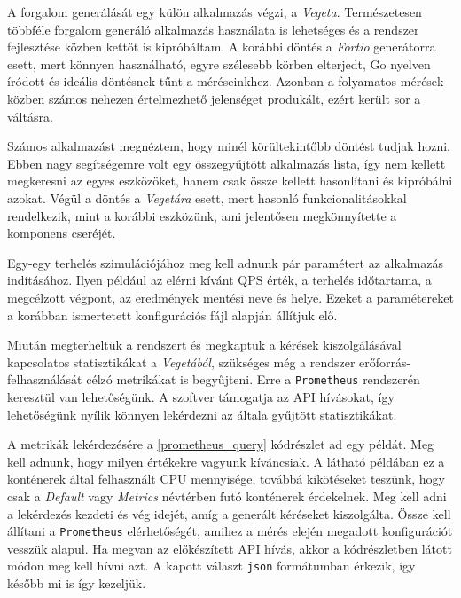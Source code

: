 \lstset{caption=Mérés konfigurációja, label=measurement_config}


A forgalom generálását egy külön alkalmazás végzi, a \textit{Vegeta}\citep{vegetaGithub}. 
Természetesen többféle forgalom generáló alkalmazás használata is lehetséges és a rendszer fejlesztése közben kettőt is kipróbáltam.
A korábbi döntés a \textit{Fortio} generátorra esett, mert könnyen használható, egyre szélesebb körben elterjedt, Go nyelven íródott és ideális döntésnek tűnt a méréseinkhez.
Azonban a folyamatos mérések közben számos  nehezen értelmezhető jelenséget produkált, ezért került sor a váltásra. 

Számos alkalmazást megnéztem, hogy minél körültekintőbb döntést tudjak hozni. 
Ebben nagy segítségemre volt egy összegyűjtött alkalmazás lista\citep{benchmarkToolsList}, így nem kellett megkeresni az egyes eszközöket, hanem csak össze kellett hasonlítani és kipróbálni azokat.
Végül a döntés a \textit{Vegetára} esett, mert hasonló funkcionalitásokkal rendelkezik, mint a korábbi eszközünk, ami jelentősen megkönnyítette a komponens cseréjét.

Egy-egy terhelés szimulációjához meg kell adnunk pár paramétert az alkalmazás indításához. 
Ilyen például az elérni kívánt QPS érték, a terhelés időtartama, a megcélzott végpont, az eredmények mentési neve és helye.
Ezeket a paramétereket a korábban ismertetett konfigurációs fájl alapján állítjuk elő.

%

Miután megterheltük a rendszert és megkaptuk a kérések kiszolgálásával kapcsolatos statisztikákat a \textit{Vegetából}, szükséges még a rendszer erőforrás-felhasználását célzó metrikákat is begyűjteni. 
Erre a \verb+Prometheus+ rendszerén keresztül van lehetőségünk.
A szoftver támogatja az API hívásokat, így lehetőségünk nyílik könnyen lekérdezni az általa gyűjtött statisztikákat. 

A metrikák lekérdezésére a \ref{prometheus_query} kódrészlet ad egy példát. Meg kell adnunk, hogy milyen értékekre vagyunk kíváncsiak. 
A látható példában ez a konténerek által felhasznált CPU mennyisége, továbbá kikötéseket teszünk, hogy csak a \textit{Default} vagy \textit{Metrics} névtérben futó konténerek érdekelnek.
Meg kell adni a lekérdezés kezdeti és vég idejét, amíg a generált kéréseket kiszolgálta.
Össze kell állítani a \verb+Prometheus+ elérhetőségét, amihez a mérés elején megadott konfigurációt vesszük alapul. Ha megvan az előkészített API hívás, akkor a kódrészletben látott módon meg kell hívni azt.
A kapott választ \verb+json+ formátumban érkezik, így később mi is így kezeljük. \\


